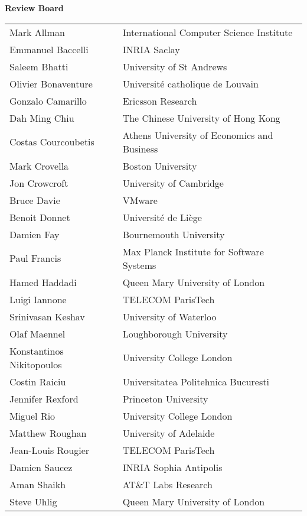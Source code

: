 \begin{center}
{\Large \textbf{Review Board}}


 
\vspace{1in}

\begin{tabular}{ll}
Mark Allman &	International Computer Science Institute \\
Emmanuel Baccelli    &	INRIA Saclay\\
Saleem Bhatti	& University of St Andrews \\
Olivier Bonaventure &	Universit\'{e} catholique de Louvain \\
Gonzalo Camarillo  &  Ericsson Research   \\
Dah Ming Chiu   &   The Chinese University of Hong Kong \\
Costas Courcoubetis  & Athens University of Economics and Business \\
Mark Crovella & Boston University \\
Jon Crowcroft	&  University of Cambridge \\
Bruce Davie	& VMware \\
Benoit Donnet  &   Universit\'{e} de Li\`{e}ge  \\
Damien Fay & Bournemouth University  \\
Paul Francis & Max Planck Institute for Software Systems \\
Hamed Haddadi &	Queen Mary University of London\\
Luigi Iannone &  TELECOM ParisTech \\
Srinivasan Keshav    &	University of Waterloo\\
Olaf Maennel  & Loughborough University \\
Konstantinos Nikitopoulos & University College London \\
Costin Raiciu &  Universitatea Politehnica Bucuresti  \\
Jennifer Rexford &	Princeton University\\
Miguel Rio & University College London \\ 
Matthew Roughan & University of Adelaide \\
Jean-Louis Rougier  &  TELECOM ParisTech \\
Damien Saucez  & INRIA Sophia Antipolis \\
Aman Shaikh  & AT\&T Labs Research \\
Steve Uhlig & Queen Mary University of London\\
\end{tabular}
\end{center}



%